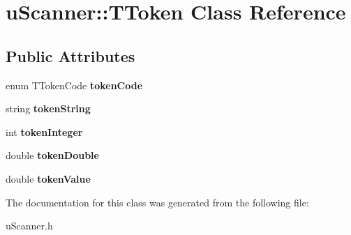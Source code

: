 \hypertarget{classu_scanner_1_1_t_token}{\section{u\-Scanner\-:\-:T\-Token Class Reference}
\label{classu_scanner_1_1_t_token}
}
\subsection*{Public Attributes}
\begin{DoxyCompactItemize}
\item 
\hypertarget{classu_scanner_1_1_t_token_afc96d324429e365ff5c73adc550bb5ec}{enum T\-Token\-Code {\bfseries token\-Code}}\label{classu_scanner_1_1_t_token_afc96d324429e365ff5c73adc550bb5ec}

\item 
\hypertarget{classu_scanner_1_1_t_token_a208c70bb8884eb61857f50691a22e837}{string {\bfseries token\-String}}\label{classu_scanner_1_1_t_token_a208c70bb8884eb61857f50691a22e837}

\item 
\hypertarget{classu_scanner_1_1_t_token_ab5e540c56e179966b68ecba659f191e1}{int {\bfseries token\-Integer}}\label{classu_scanner_1_1_t_token_ab5e540c56e179966b68ecba659f191e1}

\item 
\hypertarget{classu_scanner_1_1_t_token_aa1abfc6baac4558f629cbba8d969d618}{double {\bfseries token\-Double}}\label{classu_scanner_1_1_t_token_aa1abfc6baac4558f629cbba8d969d618}

\item 
\hypertarget{classu_scanner_1_1_t_token_ad8fcefd7d936397254dc7546f9e6c5e6}{double {\bfseries token\-Value}}\label{classu_scanner_1_1_t_token_ad8fcefd7d936397254dc7546f9e6c5e6}

\end{DoxyCompactItemize}


The documentation for this class was generated from the following file\-:\begin{DoxyCompactItemize}
\item 
u\-Scanner.\-h\end{DoxyCompactItemize}
